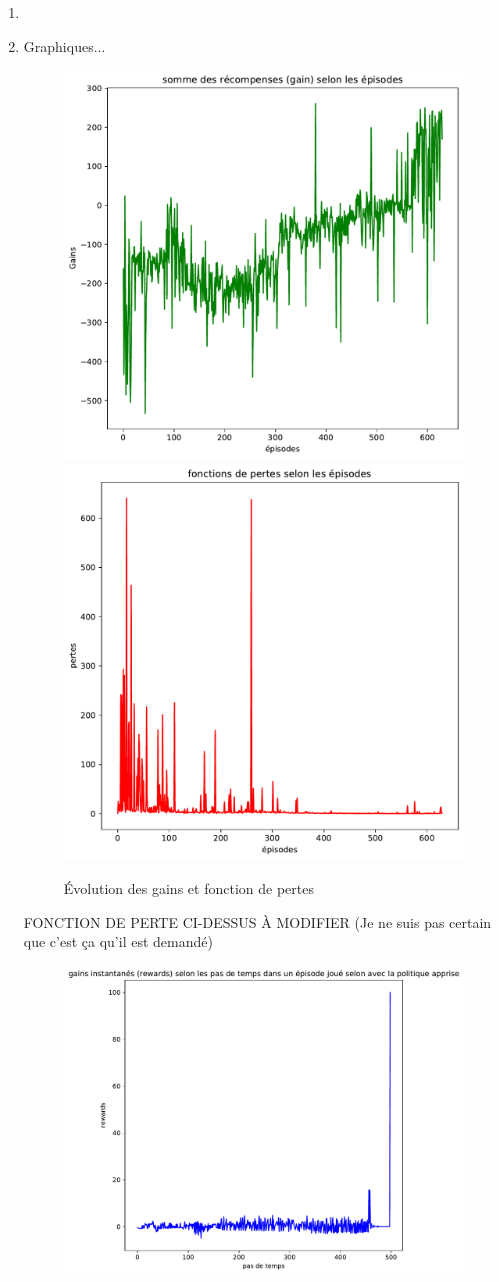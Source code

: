 \documentclass[letterpaper,11pt]{article}
\begin{document}
\begin{enumerate}
\begin{enumerate}
\item {}\\


\item Graphiques...

\begin{center}
\begin{figure}[H]
\caption{Évolution des gains et fonction de pertes}
\includegraphics[width=0.45\linewidth]{gains.pdf} \hfill \includegraphics[width=0.45\linewidth]{pertes.pdf}
\end{figure}
\end{center}

FONCTION DE PERTE CI-DESSUS À MODIFIER (Je ne suis pas certain que c'est ça qu'il est demandé)


\begin{figure}[H]
\begin{center}
\caption{}
\includegraphics[scale=0.5]{gain_par_pas.pdf}
\end{center}
\end{figure}


\end{enumerate}
\end{enumerate}
\end{document}
